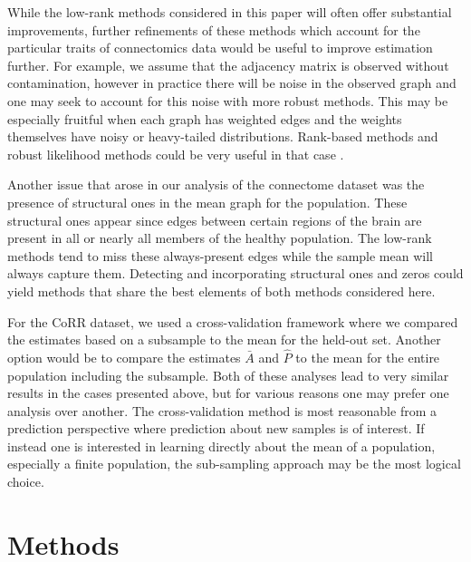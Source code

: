 \documentclass[10pt,letterpaper]{article}
\renewcommand{\hat}{\widehat}
\begin{document}
While the low-rank methods considered in this paper will often offer substantial improvements, further refinements of these methods which account for the particular traits of connectomics data would be useful to improve estimation further.
For example, we assume that the adjacency matrix is observed without contamination, however in practice there will be noise in the observed graph and one may seek to account for this noise with more robust methods.
This may be especially fruitful when each graph has weighted edges and the weights themselves have noisy or heavy-tailed distributions.
Rank-based methods and robust likelihood methods could be very useful in that case \citep{huber2009robust,qin2013maximum}. 


Another issue that arose in our analysis of the connectome dataset was the presence of structural ones in the mean graph for the population. 
These structural ones appear since edges between certain regions of the brain are present in all or nearly all members of the healthy population. 
The low-rank methods tend to miss these always-present edges while the sample mean will always capture them.
Detecting and incorporating structural ones and zeros could yield methods that share the best elements of both methods considered here.

For the CoRR dataset, we used a cross-validation framework where we compared the estimates based on a subsample to the mean for the held-out set. 
Another option would be to compare the estimates $\bar{A}$ and $\hat{P}$ to the mean for the entire population including the subsample.
Both of these analyses lead to very similar results in the cases presented above, but for various reasons one may prefer one analysis over another.
The cross-validation method is most reasonable from a prediction perspective where prediction about new samples is of interest.
If instead one is interested in learning directly about the mean of a population, especially a finite population, the sub-sampling approach may be the most logical choice.

\section{Methods}
\label{sec:method}
\end{document}
